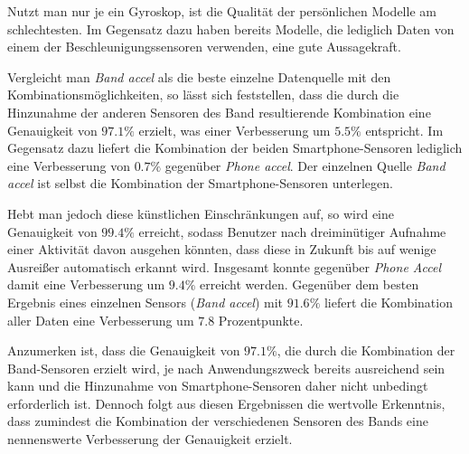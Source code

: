 Nutzt man nur je ein Gyroskop, ist die Qualität der persönlichen Modelle am schlechtesten. Im Gegensatz dazu haben bereits Modelle, die lediglich Daten von einem der Beschleunigungssensoren verwenden, eine gute Aussagekraft.

Vergleicht man \textit{Band accel} als die beste einzelne Datenquelle mit den Kombinationsmöglichkeiten, so lässt sich feststellen, dass die durch die Hinzunahme der anderen Sensoren des Band resultierende Kombination eine Genauigkeit von $97.1 \%$ erzielt, was einer Verbesserung um $5.5 \%$ entspricht. Im Gegensatz dazu liefert die Kombination der beiden Smartphone-Sensoren lediglich eine Verbesserung von $0.7 \%$ gegenüber \textit{Phone accel}. Der einzelnen Quelle \textit{Band accel} ist selbst die Kombination der Smartphone-Sensoren unterlegen.

Hebt man jedoch diese künstlichen Einschränkungen auf, so wird eine Genauigkeit von $99.4 \%$ erreicht, sodass Benutzer nach dreiminütiger Aufnahme einer Aktivität davon ausgehen könnten, dass diese in Zukunft bis auf wenige Ausreißer automatisch erkannt wird. Insgesamt konnte gegenüber \textit{Phone Accel} damit eine Verbesserung um $9.4 \%$ erreicht werden. Gegenüber dem besten Ergebnis eines einzelnen Sensors (\textit{Band accel}) mit $91.6 \%$ liefert die Kombination aller Daten eine Verbesserung um $7.8$ Prozentpunkte.

Anzumerken ist, dass die Genauigkeit von $97.1 \%$, die durch die Kombination der Band-Sensoren erzielt wird, je nach Anwendungszweck bereits ausreichend sein kann und die Hinzunahme von Smartphone-Sensoren daher nicht unbedingt erforderlich ist. Dennoch folgt aus diesen Ergebnissen die wertvolle Erkenntnis, dass zumindest die Kombination der verschiedenen Sensoren des Bands eine nennenswerte Verbesserung der Genauigkeit erzielt.

